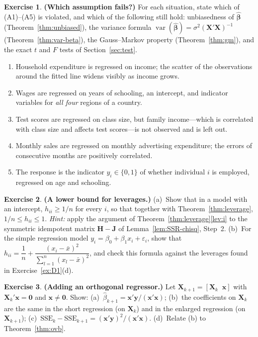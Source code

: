 \documentclass[12pt,a4paper]{article}
\theoremstyle{definition}
\newtheorem{exercise}{Exercise}
\DeclareMathOperator\var{var}
\newcommand{\SSE}{\mathrm{SSE}}
\newcommand{\bX}{\mathbf{X}}
\newcommand{\by}{\mathbf{y}}
\newcommand{\bx}{\mathbf{x}}
\def\bb{\boldsymbol{\beta}}
\newcommand{\bH}{\mathbf{H}}
\newcommand{\bzero}{\mathbf{0}}
\newcommand{\bJ}{\mathbf{J}}
\begin{document}
\begin{exercise}\label{ex:D2}
\textbf{(Which assumption fails?)} For each situation, state which of (A1)--(A5) is violated, and which of the following still hold: unbiasedness of $\hat{\bb}$ (Theorem~\ref{thm:unbiased}), the variance formula $\var(\hat{\bb}) = \sigma^2(\bX'\bX)^{-1}$ (Theorem~\ref{thm:var-beta}), the Gauss--Markov property (Theorem~\ref{thm:gm}), and the exact $t$ and $F$ tests of Section~\ref{sec:test}.
\begin{enumerate}[label=\textup{(\roman*)}]
\item Household expenditure is regressed on income; the scatter of the observations around the fitted line widens visibly as income grows.
\item Wages are regressed on years of schooling, an intercept, and indicator variables for \emph{all four} regions of a country.
\item Test scores are regressed on class size, but family income---which is correlated with class size and affects test scores---is not observed and is left out.
\item Monthly sales are regressed on monthly advertising expenditure; the errors of consecutive months are positively correlated.
\item The response is the indicator $y_i \in \{0, 1\}$ of whether individual $i$ is employed, regressed on age and schooling.
\end{enumerate}
\end{exercise}

\begin{exercise}\label{ex:D3}
\textbf{(A lower bound for leverages.)} (a)~Show that in a model with an intercept, $h_{ii} \geqslant 1/n$ for every $i$, so that together with Theorem~\ref{thm:leverage}, $1/n \leqslant h_{ii} \leqslant 1$. \emph{Hint:} apply the argument of Theorem~\ref{thm:leverage}\ref{lev:i} to the symmetric idempotent matrix $\bH - \bJ$ of Lemma~\ref{lem:SSR-chisq}, Step~2. (b)~For the simple regression model $y_i = \beta_0 + \beta_1 x_i + \varepsilon_i$, show that $h_{ii} = \dfrac{1}{n} + \dfrac{(x_i - \bar{x})^2}{\sum_{l=1}^n (x_l - \bar{x})^2}$, and check this formula against the leverages found in Exercise~\ref{ex:D1}(d).
\end{exercise}

\begin{exercise}\label{ex:D4}
\textbf{(Adding an orthogonal regressor.)} Let $\bX_{k+1} = [\bX_k \;\; \bx]$ with $\bX_k'\bx = \bzero$ and $\bx \neq \bzero$. Show: (a)~$\hat{\beta}_{k+1} = \bx'\by/(\bx'\bx)$; (b)~the coefficients on $\bX_k$ are the same in the short regression (on $\bX_k$) and in the enlarged regression (on $\bX_{k+1}$); (c)~$\SSE_k - \SSE_{k+1} = (\bx'\by)^2/(\bx'\bx)$. (d)~Relate (b) to Theorem~\ref{thm:ovb}.
\end{exercise}
\end{document}
